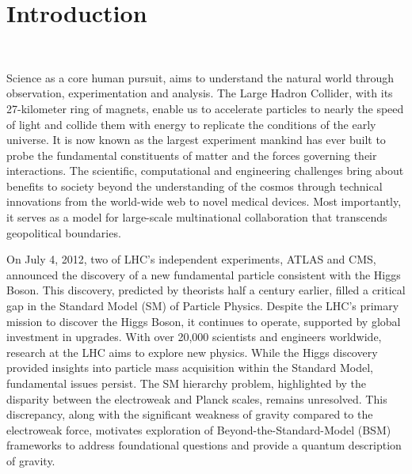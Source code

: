 \chapter{Introduction}~\label{ch:intro}

Science as a core human pursuit, aims to understand the natural world through observation, experimentation and analysis. The Large Hadron Collider, with its 27-kilometer ring of magnets, enable us to accelerate particles to nearly the speed of light and collide them with energy to replicate the conditions of the early universe. It is now known as the largest experiment mankind has ever built to probe the fundamental constituents of matter and the forces governing their interactions. The scientific, computational and engineering challenges bring about benefits to society beyond the understanding of the cosmos through technical innovations from the world-wide web to novel medical devices. Most importantly, it serves as a model for large-scale multinational collaboration that transcends geopolitical boundaries.


On July 4, 2012, two of LHC's independent experiments, ATLAS and CMS, announced the discovery of a new fundamental particle consistent with the Higgs Boson. This discovery, predicted by theorists half a century earlier, filled a critical gap in the Standard Model (SM) of Particle Physics. Despite the LHC's primary mission to discover the Higgs Boson, it continues to operate, supported by global investment in upgrades. With over 20,000 scientists and engineers worldwide, research at the LHC aims to explore new physics. While the Higgs discovery provided insights into particle mass acquisition within the Standard Model, fundamental issues persist. The SM hierarchy problem, highlighted by the disparity between the electroweak and Planck scales, remains unresolved. This discrepancy, along with the significant weakness of gravity compared to the electroweak force, motivates exploration of Beyond-the-Standard-Model (BSM) frameworks to address foundational questions and provide a quantum description of gravity.


